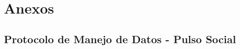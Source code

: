 \documentclass[11pt,oneside,a4paper,english,french,spanish,brazil]{abntex2}
\begin{document}
          
          \clearpage
          \newpage
        
          
          \pagestyle{modal}
 
           
           \clearpage
           
          
          \clearpage
          
          \pagestyle{modal}
           
           \clearpage




          \pagestyle{modalpre}

            \clearpage
            

            
            
             \part*{Anexos}
             \begin{anexosenv}
             
             \chapter{Protocolo de Manejo de Datos - Pulso Social}\label{anex:anexo1}
                
             \end{anexosenv}

            \printindex



\end{document}

